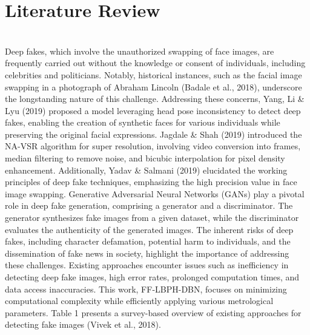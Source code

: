 \chapter{Literature Review}
\\
Deep fakes, which involve the unauthorized swapping of face images, are frequently carried out without the knowledge or consent of individuals, including celebrities and politicians. Notably, historical instances, such as the facial image swapping in a photograph of Abraham Lincoln (Badale et al., 2018), underscore the longstanding nature of this challenge. Addressing these concerns, Yang, Li \& Lyu (2019) proposed a model leveraging head pose inconsistency to detect deep fakes, enabling the creation of synthetic faces for various individuals while preserving the original facial expressions.
Jagdale \& Shah (2019) introduced the NA-VSR algorithm for super resolution, involving video conversion into frames, median filtering to remove noise, and bicubic interpolation for pixel density enhancement. Additionally, Yadav \& Salmani (2019) elucidated the working principles of deep fake techniques, emphasizing the high precision value in face image swapping.
Generative Adversarial Neural Networks (GANs) play a pivotal role in deep fake generation, comprising a generator and a discriminator. The generator synthesizes fake images from a given dataset, while the discriminator evaluates the authenticity of the generated images. The inherent risks of deep fakes, including character defamation, potential harm to individuals, and the dissemination of fake news in society, highlight the importance of addressing these challenges.
Existing approaches encounter issues such as inefficiency in detecting deep fake images, high error rates, prolonged computation times, and data access inaccuracies. This work, FF-LBPH-DBN, focuses on minimizing computational complexity while efficiently applying various metrological parameters. Table 1 presents a survey-based overview of existing approaches for detecting fake images (Vivek et al., 2018).
